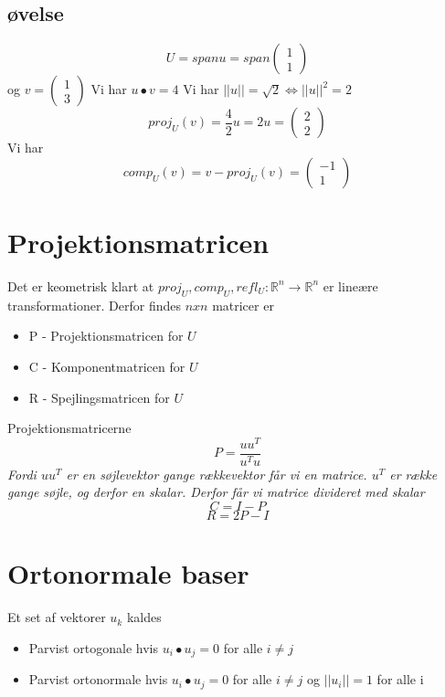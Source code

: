\documentclass[a4paper,fleqn]{report}
\newcommand{\RR}{\mathbb{R}}
\begin{document}
	\subsection{øvelse}
	\[ U = span u = span \begin{pmatrix}1\\1\end{pmatrix}\] og $v =  \begin{pmatrix}1\\3\end{pmatrix}$
	Vi har $u \bullet v = 4$ Vi har $||u|| = \sqrt{2} \Leftrightarrow ||u||^2 = 2$
	\[ proj_U(v) = \frac{4}{2}u = 2u = \begin{pmatrix}2\\2\end{pmatrix}\]
	Vi har
	\[ comp_U (v) = v - proj_U(v) = \begin{pmatrix}-1\\1\end{pmatrix} \]

	
	\section{Projektionsmatricen}
	Det er keometrisk klart at $proj_U, comp_U, refl_U : \RR^n \rightarrow \RR^n$ er lineære
	transformationer. Derfor findes $nxn $ matricer er 
	\begin{itemize}
		\item P - Projektionsmatricen for $U$
		\item C - Komponentmatricen for $U$
		\item R - Spejlingsmatricen for $U$
	\end{itemize}
	Projektionsmatricerne\\
	\[ P = \frac{uu^T}{u^Tu} \]\emph{Fordi $uu^T$ er en søjlevektor gange rækkevektor får vi en
		matrice. $u^T$ er række gange søjle, og derfor en skalar. Derfor får vi matrice
	divideret med skalar}
	\[ C = I - P\]
	\[ R = 2P - I\]

	\section{Ortonormale baser}
	Et set af vektorer $u_k$ kaldes
	\begin{itemize}
		\item Parvist ortogonale hvis $u_i \bullet u_j = 0$ for alle $i \neq j$
		\item Parvist ortonormale hvis $u_i \bullet u_j = 0$ for alle $i \neq j$ og 
			$||u_i|| = 1$ for alle i
	\end{itemize}
\end{document}
